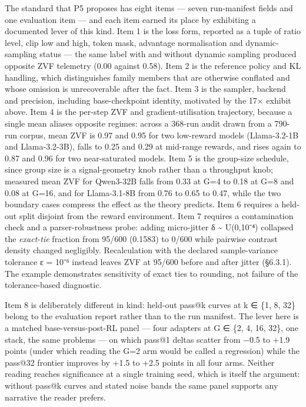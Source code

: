 \documentclass[12pt,a4paper]{report}
\begin{document}
The standard that P5 proposes has eight items --- seven run-manifest
fields and one evaluation item --- and each item earned its place by
exhibiting a documented lever of this kind. Item 1 is the loss form,
reported as a tuple of ratio level, clip low and high, token mask,
advantage normalisation and dynamic-sampling status --- the same label
with and without dynamic sampling produced opposite ZVF telemetry (0.00
against 0.58). Item 2 is the reference policy and KL handling, which
distinguishes family members that are otherwise conflated and whose
omission is unrecoverable after the fact. Item 3 is the sampler, backend
and precision, including base-checkpoint identity, motivated by the 17×
exhibit above. Item 4 is the per-step ZVF and gradient-utilisation
trajectory, because a single mean aliases opposite regimes: across a
368-run audit drawn from a 790-run corpus, mean ZVF is 0.97 and 0.95 for
two low-reward models (Llama-3.2-1B and Llama-3.2-3B), falls to 0.25 and
0.29 at mid-range rewards, and rises again to 0.87 and 0.96 for two
near-saturated models. Item 5 is the group-size schedule, since group
size is a signal-geometry knob rather than a throughput knob; measured
mean ZVF for Qwen3-32B falls from 0.33 at G=4 to 0.18 at G=8 and 0.08 at
G=16, and for Llama-3.1-8B from 0.76 to 0.65 to 0.47, while the two
boundary cases compress the effect as the theory predicts. Item 6
requires a held-out split disjoint from the reward environment. Item 7
requires a contamination check and a parser-robustness probe: adding
micro-jitter δ \textasciitilde{} U(0,10⁻⁴) collapsed the
\emph{exact-tie} fraction from 95/600 (0.1583) to 0/600 while pairwise
contrast density changed negligibly. Recalculation with the declared
sample-variance tolerance ε = 10⁻⁶ instead leaves ZVF at 95/600 before
and after jitter (§6.3.1). The example demonstrates sensitivity of exact
ties to rounding, not failure of the tolerance-based diagnostic.

Item 8 is deliberately different in kind: held-out pass@k curves at k ∈
\{1, 8, 32\} belong to the evaluation report rather than to the run
manifest. The lever here is a matched base-versus-post-RL panel --- four
adapters at G ∈ \{2, 4, 16, 32\}, one stack, the same problems --- on
which pass@1 deltas scatter from −0.5 to +1.9 points (under which
reading the G=2 arm would be called a regression) while the pass@32
frontier improves by +1.5 to +2.5 points in all four arms. Neither
reading reaches significance at a single training seed, which is itself
the argument: without pass@k curves and stated noise bands the same
panel supports any narrative the reader prefers.
\end{document}
